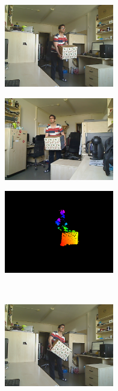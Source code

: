 \begin{figure}
\centering
\begin{subfigure}[b]{.32\linewidth}
	\centering
	\includegraphics[width=135pt]{figures/scene3/left_152.png}
  \end{subfigure}
\begin{subfigure}[b]{.32\linewidth}
	\centering
	\includegraphics[width=135pt]{figures/scene3/right_152.png}
  \end{subfigure}
\begin{subfigure}[b]{.32\linewidth}
	\centering
	\includegraphics[width=135pt]{figures/scene3/vis_152.png}
  \end{subfigure}\\\vspace{5pt}
\begin{subfigure}[b]{.32\linewidth}
	\centering
	\includegraphics[width=135pt]{figures/scene3/left_196.png}
  \end{subfigure}
\begin{subfigure}[b]{.32\linewidth}
	\centering

\end{subfigure}
\end{figure}
